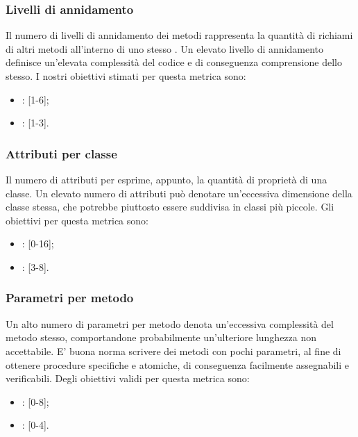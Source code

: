 \subsubsection{Livelli di annidamento}
\label{4.2.2}
Il numero di livelli di annidamento dei metodi rappresenta la quantità di richiami di altri metodi all'interno di uno stesso .
Un elevato livello di annidamento definisce un'elevata complessità del codice e di conseguenza comprensione dello stesso.
I nostri obiettivi stimati per questa metrica sono:
\begin{itemize}
\item {}: [1-6];
\item {}: [1-3].
\end{itemize}

\subsubsection{Attributi per classe}
\label{4.2.3}
Il numero di attributi per  esprime, appunto, la quantità di proprietà di una classe. Un elevato numero di attributi può denotare un'eccessiva dimensione della classe stessa, che potrebbe piuttosto essere suddivisa in classi più piccole.
Gli obiettivi per questa metrica sono:
\begin{itemize}
\item {}: [0-16];
\item {}: [3-8].
\end{itemize}

\subsubsection{Parametri per metodo}
\label{4.2.4}
Un alto numero di parametri per metodo denota un'eccessiva complessità del metodo stesso, comportandone probabilmente un'ulteriore lunghezza non accettabile. E' buona norma scrivere dei metodi con pochi parametri, al fine di ottenere procedure specifiche e atomiche, di conseguenza facilmente assegnabili e verificabili.
Degli obiettivi validi per questa metrica sono:
\begin{itemize}
\item {}: [0-8];
\item {}: [0-4].
\end{itemize}

